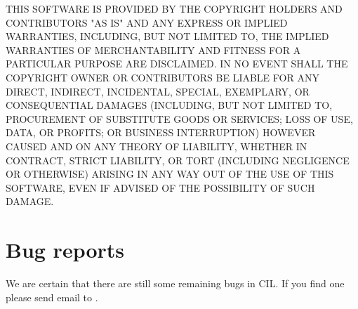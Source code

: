\documentclass{article}
\begin{document}
THIS SOFTWARE IS PROVIDED BY THE COPYRIGHT HOLDERS AND CONTRIBUTORS "AS IS"
AND ANY EXPRESS OR IMPLIED WARRANTIES, INCLUDING, BUT NOT LIMITED TO, THE
IMPLIED WARRANTIES OF MERCHANTABILITY AND FITNESS FOR A PARTICULAR PURPOSE
ARE DISCLAIMED. IN NO EVENT SHALL THE COPYRIGHT OWNER OR CONTRIBUTORS BE
LIABLE FOR ANY DIRECT, INDIRECT, INCIDENTAL, SPECIAL, EXEMPLARY, OR
CONSEQUENTIAL DAMAGES (INCLUDING, BUT NOT LIMITED TO, PROCUREMENT OF
SUBSTITUTE GOODS OR SERVICES; LOSS OF USE, DATA, OR PROFITS; OR BUSINESS
INTERRUPTION) HOWEVER CAUSED AND ON ANY THEORY OF LIABILITY, WHETHER IN
CONTRACT, STRICT LIABILITY, OR TORT (INCLUDING NEGLIGENCE OR OTHERWISE)
ARISING IN ANY WAY OUT OF THE USE OF THIS SOFTWARE, EVEN IF ADVISED OF THE
POSSIBILITY OF SUCH DAMAGE.

\section{Bug reports}
 
 We are certain that there are still some remaining bugs in CIL. If you find
one please send email to .  
 
\end{document}
